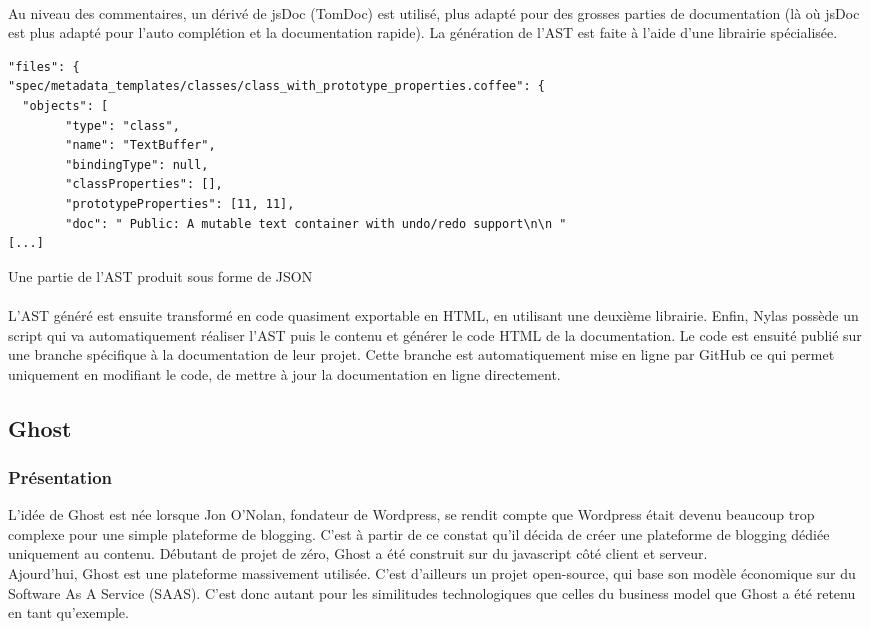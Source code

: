         \paragraph{}
            Au niveau des commentaires, un dérivé de jsDoc (TomDoc\cite{tomdoc}) est utilisé, plus adapté
            pour des grosses parties de documentation (là où jsDoc est plus adapté pour l'auto complétion et la documentation rapide).
            La génération de l'AST est faite à l'aide d'une librairie spécialisée\cite{donna}.
        \begin{listing}[ht]
            \begin{verbatim}
"files": {
"spec/metadata_templates/classes/class_with_prototype_properties.coffee": {
  "objects": [
        "type": "class",
        "name": "TextBuffer",
        "bindingType": null,
        "classProperties": [],
        "prototypeProperties": [11, 11],
        "doc": " Public: A mutable text container with undo/redo support\n\n "
[...]
            \end{verbatim} \caption{Une partie de l'AST produit sous forme de JSON}
        \end{listing}

        \paragraph{}
            L'AST généré est ensuite transformé en code quasiment exportable en HTML, en utilisant une deuxième librairie\cite{tello}.
            Enfin, Nylas possède un script qui va automatiquement réaliser l'AST puis le contenu et générer le code HTML de la documentation.
            Le code est ensuité publié sur une branche spécifique à la documentation de leur projet.
            Cette branche est automatiquement mise en ligne par GitHub\cite{ghpages} ce qui permet uniquement en
            modifiant le code, de mettre à jour la documentation en ligne directement.

\subsection{Ghost}
    \subsubsection{Présentation}
        L'idée de Ghost est née lorsque Jon O'Nolan, fondateur de Wordpress, se rendit compte que
        Wordpress était devenu beaucoup trop complexe pour une simple plateforme de blogging. C'est
        à partir de ce constat qu'il décida de créer une plateforme de blogging dédiée uniquement au
        contenu. Débutant de projet de zéro, Ghost a été construit sur du javascript côté client et
        serveur.\\
        Ajourd'hui, Ghost est une plateforme massivement utilisée. C'est d'ailleurs un projet open-source,
        qui base son modèle économique sur du Software As A Service (SAAS). C'est donc autant pour les
        similitudes technologiques que celles du business model que Ghost a été retenu en tant qu'exemple.

